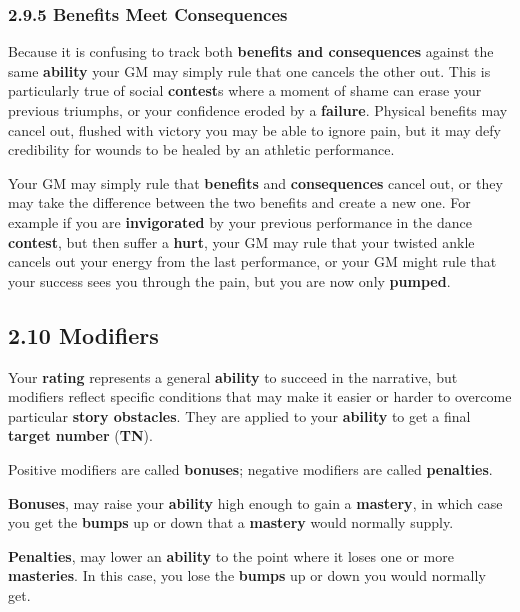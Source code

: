 \documentclass[
]{article}
\begin{document}
\hypertarget{benefits-meet-consequences}{%
\subsubsection{2.9.5 Benefits Meet
Consequences}\label{benefits-meet-consequences}}

Because it is confusing to track both \textbf{benefits and consequences}
against the same \textbf{ability} your GM may simply rule that one
cancels the other out. This is particularly true of social
\textbf{contest}s where a moment of shame can erase your previous
triumphs, or your confidence eroded by a \textbf{failure}. Physical
benefits may cancel out, flushed with victory you may be able to ignore
pain, but it may defy credibility for wounds to be healed by an athletic
performance.

Your GM may simply rule that \textbf{benefits} and \textbf{consequences}
cancel out, or they may take the difference between the two benefits and
create a new one. For example if you are \textbf{invigorated} by your
previous performance in the dance \textbf{contest}, but then suffer a
\textbf{hurt}, your GM may rule that your twisted ankle cancels out your
energy from the last performance, or your GM might rule that your
success sees you through the pain, but you are now only \textbf{pumped}.

\hypertarget{modifiers}{%
\subsection{2.10 Modifiers}\label{modifiers}}

Your \textbf{rating} represents a general \textbf{ability} to succeed in
the narrative, but modifiers reflect specific conditions that may make
it easier or harder to overcome particular \textbf{story obstacles}.
They are applied to your \textbf{ability} to get a final \textbf{target
number} (\textbf{TN}).

Positive modifiers are called \textbf{bonuses}; negative modifiers are
called \textbf{penalties}.

\textbf{Bonuses}, may raise your \textbf{ability} high enough to gain a
\textbf{mastery}, in which case you get the \textbf{bumps} up or down
that a \textbf{mastery} would normally supply.

\textbf{Penalties}, may lower an \textbf{ability} to the point where it
loses one or more \textbf{masteries}. In this case, you lose the
\textbf{bumps} up or down you would normally get.
\end{document}
